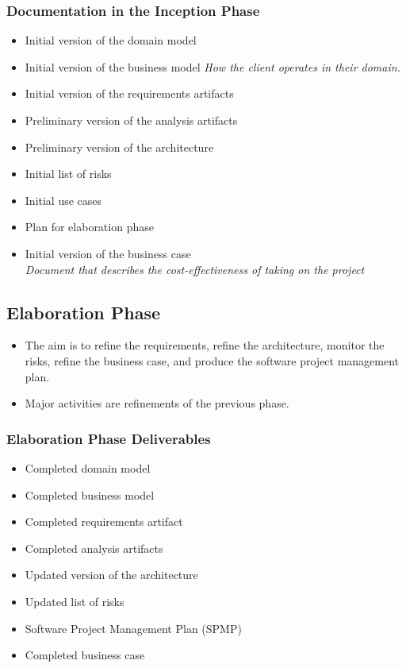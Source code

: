 \documentclass{report}
\begin{document}
				\subsubsection{Documentation in the Inception Phase}
					\begin{itemize}
						\item Initial version of the domain model
						\item Initial version of the business model
							\textit{How the client operates in their domain.}
						\item Initial version of the requirements artifacts
						\item Preliminary version of the analysis artifacts
						\item Preliminary version of the architecture
						\item Initial list of risks
						\item Initial use cases
						\item Plan for elaboration phase
						\item Initial version of the business case\\
							\textit{Document that describes the cost-effectiveness of taking on the project}
					\end{itemize}
			\subsection{Elaboration Phase}
				\begin{itemize}
					\item The aim is to refine the requirements, refine the architecture, monitor the risks, refine the business case, and produce the software project management plan.
					\item Major activities are refinements of the previous phase.
				\end{itemize}
				\subsubsection{Elaboration Phase Deliverables}
					\begin{itemize}
						\item Completed domain model
						\item Completed business model
						\item Completed requirements artifact
						\item Completed analysis artifacts
						\item Updated version of the architecture
						\item Updated list of risks
						\item Software Project Management Plan (SPMP)
						\item Completed business case
					\end{itemize}
\end{document}
